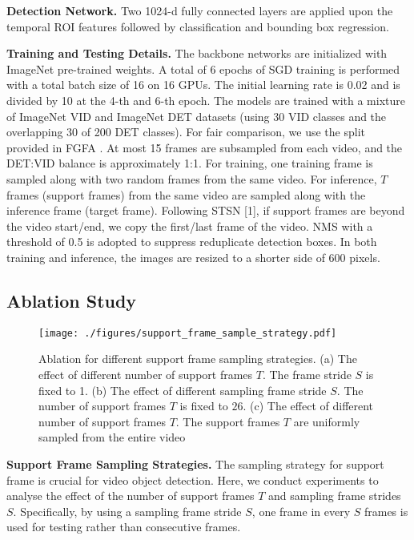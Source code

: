 \documentclass[letterpaper]{article} \usepackage{aaai21}  \usepackage{times}  \usepackage{helvet} \usepackage{courier}  \usepackage[hyphens]{url}  \usepackage{graphicx} \usepackage{hyperref}
\begin{document}
\noindent\textbf{Detection Network.}
Two 1024-d fully connected layers are applied upon the temporal ROI features followed by classification and bounding box regression.

\noindent\textbf{Training and Testing Details.}
The backbone networks are initialized with ImageNet pre-trained weights. A total of 6 epochs of SGD training is performed with a total batch size of 16 on 16 GPUs. The initial learning rate is 0.02 and is divided by 10 at the 4-th and 6-th epoch. The models are trained with a mixture of ImageNet VID and ImageNet DET datasets \cite{russakovsky2015imagenet} (using 30 VID classes and the overlapping 30 of 200 DET classes). For fair comparison, we use the split provided in FGFA \cite{zhu2017flow}. At most 15 frames are subsampled from each video, and the DET:VID balance is approximately 1:1. For training, one training frame is sampled along with two random frames from the same video. For inference, $T$ frames (support frames) from the same video are sampled along with the inference frame (target frame). Following STSN [1], if support frames are beyond the video start/end, we copy the first/last frame of the video. NMS with a threshold of 0.5 is adopted to suppress reduplicate detection boxes. In both training and inference, the images are resized to a shorter side of 600 pixels.

\subsection{Ablation Study}
\label{exp_ablation}
\begin{figure}[t]
\centering
\texttt{[image: ./figures/support\_frame\_sample\_strategy.pdf]}
\caption{Ablation for different support frame sampling strategies. (a) The effect of different number of support frames $T$. The frame stride $S$ is fixed to 1. (b) The effect of different sampling frame stride $S$. The number of support frames $T$ is fixed to $26$. (c) The effect of different number of support frames $T$. The support frames $T$ are uniformly  sampled from the entire video}
\label{fig:support_frame_sample_strategy}
\vspace{-0.25cm}
\end{figure}

\noindent\textbf{Support Frame Sampling Strategies.}
The sampling strategy for support frame is crucial for video object detection.
Here, we conduct experiments to analyse the effect of the number of support frames $T$ and sampling frame strides $S$.
Specifically, by using a sampling frame stride $S$, one frame in every $S$ frames is used for testing rather than consecutive frames.
\end{document}
